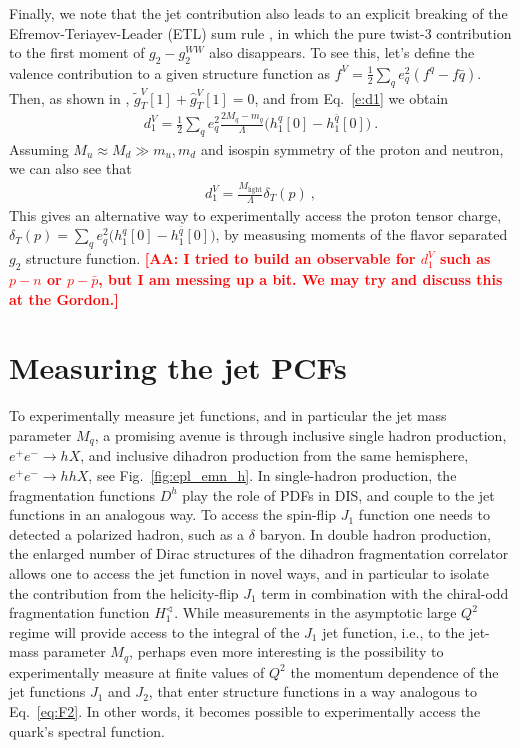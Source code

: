 \documentclass[preprintnumbers,floatfix,nofootinbib]{revtex4}
\def\AAcom#1{{\bf  \textcolor{Red}{[AA: {#1}]}}}
\newcommand{\mj}{M_q}
\newcommand{\mq}{m_q}
\begin{document}
Finally, we note that the jet contribution also leads to an explicit breaking of the Efremov-Teriayev-Leader (ETL) sum rule \cite{Efremov:1996hd}, in which the pure twist-3 contribution to the first moment of $g_2-g_2^{WW}$ also disappears. To see this, let's define the valence contribution to a given structure function as $f^V=\frac12\sum_q e_q^2 (f^q-f{\bar q})$. Then, as shown in \cite{Efremov:1996hd}, $\tilde g_T^V[1]+\widehat g_T^V[1] = 0$, and from Eq.~\eqref{e:d1} we obtain
\begin{align}
  d_1^V = \frac12 \sum_q e_q^2 \frac{2\mj- \mq}{\Lambda} 
    \big(h_1^{q}[0]-h_1^{\bar q}[0]\big) \ .
\end{align}
Assuming $M_u \approx M_d \gg m_u , m_d$ and isospin symmetry of the proton and neutron, we can also see that 
\begin{align}
  d_1^V = \frac{M_{\text{light}}}{\Lambda} \delta_T(p) \ ,   
\end{align}
This gives an alternative way to experimentally access the proton tensor charge, $\delta_T(p) = \sum_q e_q^2 \big(h_1^{q}[0]-h_1^{\bar q}[0]\big)$, by measusing moments of the flavor separated $g_2$ structure function.
\AAcom{I tried to build an observable for $d_1^V$ such as $p-n$ or $p-\bar p$, but I am messing up a bit. We may try and discuss this at the Gordon.}


\section{Measuring the jet PCFs}


To experimentally measure jet functions, and in particular the jet mass parameter $M_q$, a promising avenue is through inclusive single hadron production, $e^+ e^- \to h X$, and inclusive dihadron 
production from the same hemisphere, $e^+ e^- \to h h X$, see 
Fig.~\ref{fig:epl_emn_h}.
In single-hadron production, the fragmentation functions $D^h$
play the role of PDFs in DIS, and couple to the jet functions
in an analogous way. To access the spin-flip $J_1$ function one needs to detected a polarized hadron, such as a $\delta$ baryon. 
In double hadron production, the enlarged number of Dirac structures
of the dihadron fragmentation correlator allows one to access
the jet function in novel ways, and in particular to isolate the
contribution from the helicity-flip $J_1$ term in combination with the
chiral-odd fragmentation function $H_1^{\sphericalangle}$. While measurements in the asymptotic large $Q^2$ regime will provide access to the integral of the $J_1$ jet function, i.e., to the jet-mass parameter $\mj$, perhaps even more interesting is the possibility to experimentally measure at finite values of $Q^2$ the momentum dependence of the jet functions $J_1$ and $J_2$, that enter structure functions in a way analogous to Eq.~\eqref{eq:F2}. In other words, it becomes possible to experimentally access the quark's spectral function.
\end{document}
